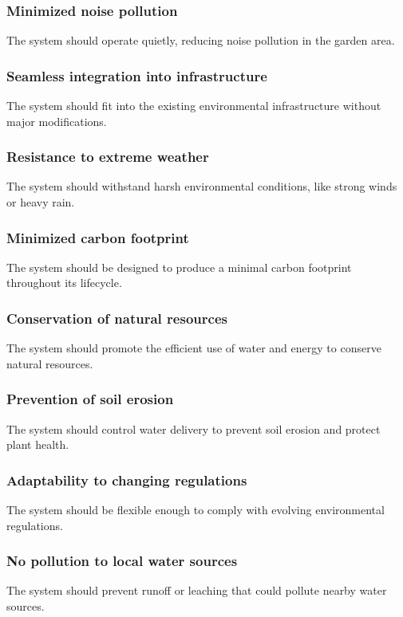 \documentclass[12pt]{report}
\begin{document}
\subsubsection{Minimized noise pollution}
The system should operate quietly, reducing noise pollution in the garden area.

\subsubsection{Seamless integration into infrastructure}
The system should fit into the existing environmental infrastructure without major modifications.

\subsubsection{Resistance to extreme weather}
The system should withstand harsh environmental conditions, like strong winds or heavy rain.

\subsubsection{Minimized carbon footprint}
The system should be designed to produce a minimal carbon footprint throughout its lifecycle.

\subsubsection{Conservation of natural resources}
The system should promote the efficient use of water and energy to conserve natural resources.

\subsubsection{Prevention of soil erosion}
The system should control water delivery to prevent soil erosion and protect plant health.

\subsubsection{Adaptability to changing regulations}
The system should be flexible enough to comply with evolving environmental regulations.

\subsubsection{No pollution to local water sources}
The system should prevent runoff or leaching that could pollute nearby water sources.
\end{document}
